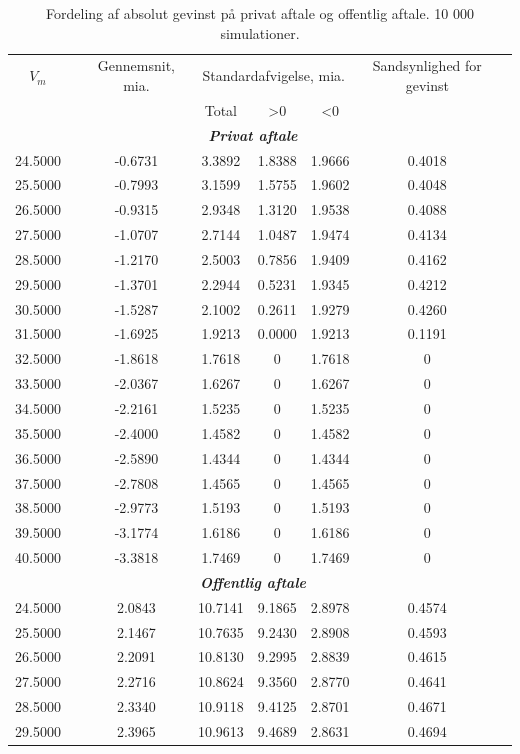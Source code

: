 \documentclass{article}
\begin{document}
\begin{table}[h]
	\caption{Fordeling af absolut gevinst p\aa{} privat aftale og offentlig aftale. 10 000 simulationer.}
	\label{tab:abs_fordeling}
	\begin{tabularx}{\linewidth}{cXcccccr}
	\toprule[1pt] 
	$V_m$ && Gennemsnit, mia. & \multicolumn{3}{c}{Standardafvigelse, mia.}  & Sandsynlighed for gevinst\\
	& & &Total & >0 & <0 \\
	\hline 
	\multicolumn{7}{c}{\emph{\textbf{Privat aftale}}} \\
   24.5000&&-0.6731& 3.3892& 1.8388& 1.9666& 0.4018\\
25.5000&&-0.7993& 3.1599& 1.5755& 1.9602& 0.4048\\
26.5000&&-0.9315& 2.9348& 1.3120& 1.9538& 0.4088\\
27.5000&&-1.0707& 2.7144& 1.0487& 1.9474& 0.4134\\
28.5000&&-1.2170& 2.5003& 0.7856& 1.9409& 0.4162\\
29.5000&&-1.3701& 2.2944& 0.5231& 1.9345& 0.4212\\
30.5000&&-1.5287& 2.1002& 0.2611& 1.9279& 0.4260\\
31.5000&&-1.6925& 1.9213& 0.0000& 1.9213& 0.1191\\
32.5000&&-1.8618& 1.7618&0& 1.7618& 0 \\
33.5000&&-2.0367& 1.6267&0& 1.6267&0\\
34.5000&&-2.2161& 1.5235&0& 1.5235&0\\
35.5000&&-2.4000& 1.4582&0& 1.4582&0\\
36.5000&&-2.5890& 1.4344&0& 1.4344&0\\
37.5000&&-2.7808& 1.4565&0& 1.4565&0\\
38.5000&&-2.9773& 1.5193&0& 1.5193&0\\
39.5000&&-3.1774& 1.6186&0& 1.6186&0\\
40.5000&&-3.3818& 1.7469&0& 1.7469&0 \\
\multicolumn{7}{c}{\emph{\textbf{Offentlig aftale}}} \\
24.5000&& 2.0843&10.7141& 9.1865& 2.8978& 0.4574 \\
25.5000&& 2.1467&10.7635& 9.2430& 2.8908& 0.4593\\
26.5000&& 2.2091&10.8130& 9.2995& 2.8839& 0.4615\\
27.5000&& 2.2716&10.8624& 9.3560& 2.8770& 0.4641\\
28.5000&& 2.3340&10.9118& 9.4125& 2.8701& 0.4671\\
29.5000&& 2.3965&10.9613& 9.4689& 2.8631& 0.4694\\

\end{tabularx}
\end{table}
\end{document}
